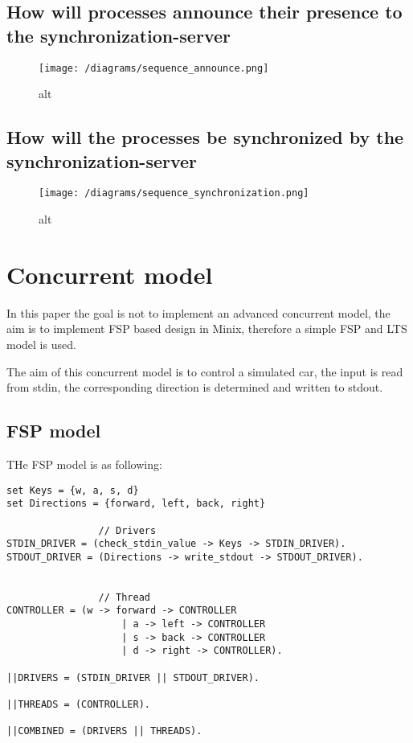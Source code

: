 \hypertarget{how-will-processes-announce-their-presence-to-the-synchronization-server}{%
\subsection{How will processes announce their presence to the
synchronization-server}\label{how-will-processes-announce-their-presence-to-the-synchronization-server}}

\begin{figure}
\centering
\texttt{[image: /diagrams/sequence\_announce.png]}
\caption{alt}
\end{figure}

\hypertarget{how-will-the-processes-be-synchronized-by-the-synchronization-server}{%
\subsection{How will the processes be synchronized by the
synchronization-server}\label{how-will-the-processes-be-synchronized-by-the-synchronization-server}}

\begin{figure}
\centering
\texttt{[image: /diagrams/sequence\_synchronization.png]}
\caption{alt}
\end{figure}

\hypertarget{concurrent-model}{%
\section{Concurrent model}\label{concurrent-model}}

In this paper the goal is not to implement an advanced concurrent model,
the aim is to implement FSP based design in Minix, therefore a simple
FSP and LTS model is used.

The aim of this concurrent model is to control a simulated car, the
input is read from stdin, the corresponding direction is determined and
written to stdout.

\hypertarget{fsp-model}{%
\subsection{FSP model}\label{fsp-model}}

THe FSP model is as following:

\begin{verbatim}
set Keys = {w, a, s, d}
set Directions = {forward, left, back, right} 

                // Drivers
STDIN_DRIVER = (check_stdin_value -> Keys -> STDIN_DRIVER).
STDOUT_DRIVER = (Directions -> write_stdout -> STDOUT_DRIVER).


                // Thread
CONTROLLER = (w -> forward -> CONTROLLER 
                    | a -> left -> CONTROLLER 
                    | s -> back -> CONTROLLER
                    | d -> right -> CONTROLLER).

||DRIVERS = (STDIN_DRIVER || STDOUT_DRIVER).

||THREADS = (CONTROLLER).

||COMBINED = (DRIVERS || THREADS).
\end{verbatim}

